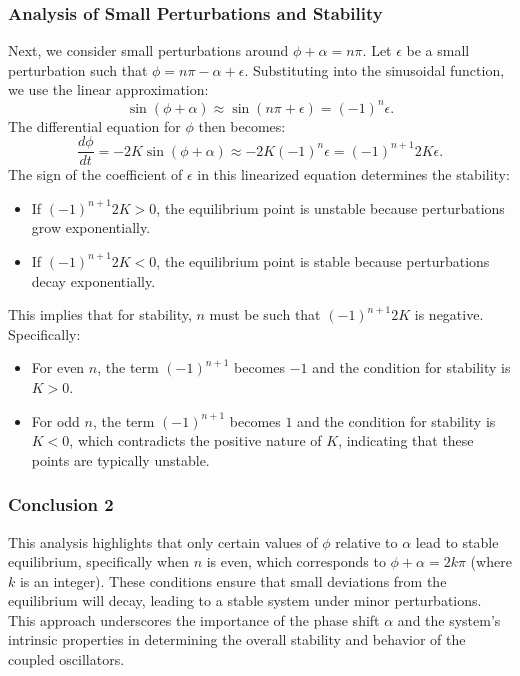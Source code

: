 \documentclass[12pt,a4paper]{article}
\begin{document}
\subsubsection{Analysis of Small Perturbations and Stability}
Next, we consider small perturbations around \(\phi + \alpha = n\pi\). Let \(\epsilon\) be a small perturbation such that \(\phi = n\pi - \alpha + \epsilon\). Substituting into the sinusoidal function, we use the linear approximation:
\[
\sin(\phi + \alpha) \approx \sin(n\pi + \epsilon) = (-1)^n \epsilon.
\]
The differential equation for \(\phi\) then becomes:
\[
\frac{d\phi}{dt} = -2K \sin(\phi + \alpha) \approx -2K (-1)^n \epsilon = (-1)^{n+1} 2K \epsilon.
\]
The sign of the coefficient of \(\epsilon\) in this linearized equation determines the stability:
\begin{itemize}
    \item If \((-1)^{n+1} 2K > 0\), the equilibrium point is unstable because perturbations grow exponentially.
    \item If \((-1)^{n+1} 2K < 0\), the equilibrium point is stable because perturbations decay exponentially.
\end{itemize}
This implies that for stability, \(n\) must be such that \((-1)^{n+1} 2K\) is negative. Specifically:
\begin{itemize}
    \item For even \(n\), the term \((-1)^{n+1}\) becomes \(-1\) and the condition for stability is \(K > 0\).
    \item For odd \(n\), the term \((-1)^{n+1}\) becomes \(1\) and the condition for stability is \(K < 0\), which contradicts the positive nature of \(K\), indicating that these points are typically unstable.
\end{itemize}

\subsubsection{Conclusion 2}
This analysis highlights that only certain values of \(\phi\) relative to \(\alpha\) lead to stable equilibrium, specifically when \(n\) is even, which corresponds to \(\phi + \alpha = 2k\pi\) (where \(k\) is an integer). These conditions ensure that small deviations from the equilibrium will decay, leading to a stable system under minor perturbations. This approach underscores the importance of the phase shift \(\alpha\) and the system's intrinsic properties in determining the overall stability and behavior of the coupled oscillators.
\end{document}
